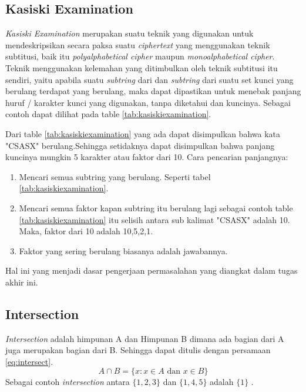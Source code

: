 	 \subsection{Kasiski Examination}
	 \textit{Kasiski Examination} merupakan suatu teknik yang digunakan untuk mendeskripsikan secara paksa suatu \textit{ciphertext} yang menggunakan teknik subtitusi, baik itu \textit{polyalphabetical cipher} maupun \textit{monoalphabetical cipher}. Teknik menggunakan kelemahan yang ditimbulkan oleh teknik subtitusi itu sendiri, yaitu apabila suatu \textit{subtring} dari \plaintext dan \textit{subtring} dari suatu set kunci yang berulang terdapat yang berulang, maka dapat dipastikan untuk menebak panjang huruf / karakter kunci yang digunakan, tanpa diketahui \plaintext dan kuncinya. Sebagai contoh dapat dilihat pada table \ref{tab:kasiskiexamination}.
	 \begin{table}[H]
		\caption{Contoh \textit{Kasiski Examintaion}}
		\label{tab:kasiskiexamination}
	\end{table}
	Dari table \ref{tab:kasiskiexamination} yang ada dapat disimpulkan bahwa kata "CSASX" berulang.Sehingga setidaknya dapat disimpulkan bahwa panjang kuncinya mungkin 5 karakter atau faktor dari 10\cite{noauthor_kasiski_nodate}.
	Cara pencarian panjangnya:
	\begin{enumerate}
	\item Mencari semua subtring yang berulang. Seperti tabel \ref{tab:kasiskiexamination}.
	\item Mencari semua faktor kapan subtring itu berulang lagi sebagai contoh table \ref{tab:kasiskiexamination} itu selisih antara sub kalimat "CSASX" adalah 10. Maka, faktor dari 10 adalah 10,5,2,1. 
	\item Faktor yang sering berulang biasanya adalah jawabannya. 
	\end{enumerate}
	 Hal ini yang menjadi dasar pengerjaan permasalahan yang diangkat dalam tugas akhir ini.
	\subsection{Intersection}
	\textit{Intersection} adalah himpunan A dan Himpunan B dimana ada bagian dari A juga merupakan bagian dari B. Sehingga dapat ditulis dengan persamaan \ref{eq:intersect}.
	\begin{equation}
	\label{eq:intersect}
	A\cap{B=\{x:x\in A \textrm{ dan } x \in B \}}
	\end{equation}
	Sebagai contoh \textit{intersection} antara $\{1,2,3\}$ dan $\{1,4,5\}$ adalah $\{1\}$\cite{devlin_joy_1993}	.
	
